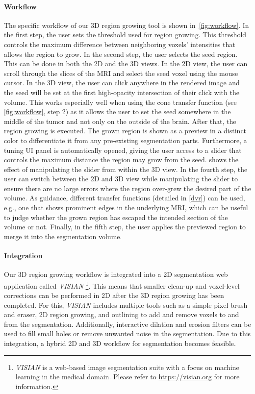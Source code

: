 \documentclass[sigconf]{acmart}
\begin{document}
\paragraph{Workflow}
The specific workflow of our 3D region growing tool is shown in~\cref{fig:workflow}.
In the first step, the user sets the threshold used for region growing. 
This threshold controls the maximum difference between neighboring voxels' intensities that allows the region to grow.
In the second step, the user selects the seed region.
This can be done in both the 2D and the 3D views.
In the 2D view, the user can scroll through the slices of the MRI and select the seed voxel using the mouse cursor.
In the 3D view, the user can click anywhere in the rendered image and the seed will be set at the first high-opacity intersection of their click with the volume.
This works especially well when using the cone transfer function (see \cref{fig:workflow}, step 2) as it allows the user to set the seed somewhere in the middle of the tumor and not only on the outside of the brain.
After that, the region growing is executed.
The grown region is shown as a preview in a distinct color to differentiate it from any pre-existing segmentation parts. 
Furthermore, a tuning UI panel is automatically opened, giving the user access to a slider that controls the maximum distance the region may grow from the seed. 
 shows the effect of manipulating the slider from within the 3D view.
In the fourth step, the user can switch between the 2D and 3D view while manipulating the slider to ensure there are no large errors where the region over-grew the desired part of the volume. 
As guidance, different transfer functions (detailed in \cref{dvr}) can be used, e.g., one that shows prominent edges in the underlying MRI, which can be useful to judge whether the grown region has escaped the intended section of the volume or not. 
Finally, in the fifth step, the user applies the previewed region to merge it into the segmentation volume.

\paragraph{Integration} 
Our 3D region growing workflow is integrated into a 2D segmentation web application called \emph{VISIAN}%
    \footnote{\emph{VISIAN} is a web-based image segmentation suite with a focus on machine learning in the medical domain. Please refer to \href{https://visian.org}{https://visian.org} for more information.}.
This means that smaller clean-up and voxel-level corrections can be performed in 2D after the 3D region growing has been completed. For this, \emph{VISIAN} includes multiple tools such as a simple pixel brush and eraser, 2D region growing, and outlining to add and remove voxels to and from the segmentation. Additionally, interactive dilation and erosion filters can be used to fill small holes or remove unwanted noise in the segmentation.
Due to this integration, a hybrid 2D and 3D workflow for segmentation becomes feasible.
\end{document}
